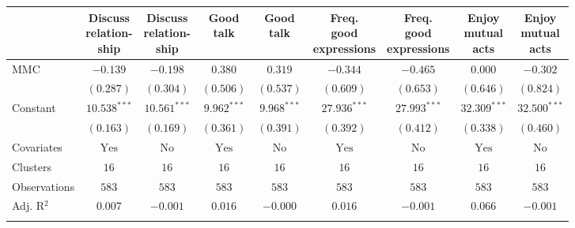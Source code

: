 
\begin{tabular}{l c c c c c c c c}
\toprule
 & \shortstack{Discuss \\ relation- \\ ship} & \shortstack{Discuss \\ relation- \\ ship} & \shortstack{Good \\ talk} & \shortstack{Good \\ talk} & \shortstack{Freq. \\ good \\ expressions} & \shortstack{Freq. \\ good \\ expressions} & \shortstack{Enjoy \\ mutual \\ acts} & \shortstack{Enjoy \\ mutual \\ acts} \\
\midrule
MMC          & $-0.139$       & $-0.198$       & $0.380$        & $0.319$       & $-0.344$       & $-0.465$       & $0.000$        & $-0.302$       \\
             & $(0.287)$      & $(0.304)$      & $(0.506)$      & $(0.537)$     & $(0.609)$      & $(0.653)$      & $(0.646)$      & $(0.824)$      \\
Constant     & $10.538^{***}$ & $10.561^{***}$ & $9.962^{***}$  & $9.968^{***}$ & $27.936^{***}$ & $27.993^{***}$ & $32.309^{***}$ & $32.500^{***}$ \\
             & $(0.163)$      & $(0.169)$      & $(0.361)$      & $(0.391)$     & $(0.392)$      & $(0.412)$      & $(0.338)$      & $(0.460)$      \\
\midrule
Covariates   & $\textrm{Yes}$ & $\textrm{No}$  & $\textrm{Yes}$ & $\textrm{No}$ & $\textrm{Yes}$ & $\textrm{No}$  & $\textrm{Yes}$ & $\textrm{No}$  \\
Clusters     & $16$           & $16$           & $16$           & $16$          & $16$           & $16$           & $16$           & $16$           \\
Observations & $583$          & $583$          & $583$          & $583$         & $583$          & $583$          & $583$          & $583$          \\
Adj. R$^2$   & $0.007$        & $-0.001$       & $0.016$        & $-0.000$      & $0.016$        & $-0.001$       & $0.066$        & $-0.001$       \\
\bottomrule
\multicolumn{9}{l}{\scriptsize{\parbox{\linewidth}{\vspace{2pt}
}}}
\end{tabular}
